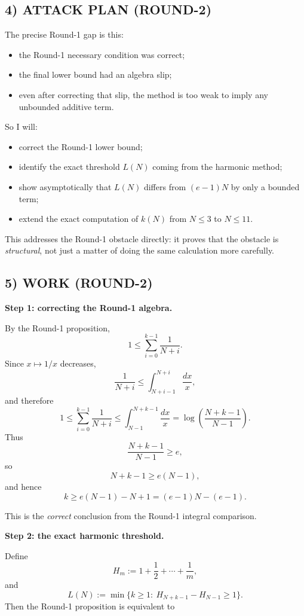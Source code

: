 \subsection*{4) ATTACK PLAN (ROUND-2)}

The precise Round-1 gap is this:

\begin{itemize}
\item the Round-1 necessary condition was correct;
\item the final lower bound had an algebra slip;
\item even after correcting that slip, the method is too weak to imply any unbounded additive term.
\end{itemize}

So I will:
\begin{itemize}
\item correct the Round-1 lower bound;
\item identify the exact threshold $L(N)$ coming from the harmonic method;
\item show asymptotically that $L(N)$ differs from $(e-1)N$ by only a bounded term;
\item extend the exact computation of $k(N)$ from $N\le 3$ to $N\le 11$.
\end{itemize}

This addresses the Round-1 obstacle directly: it proves that the obstacle is \emph{structural}, not just a matter of doing the same calculation more carefully.

\subsection*{5) WORK (ROUND-2)}

\medskip
\noindent\textbf{Step 1: correcting the Round-1 algebra.}

By the Round-1 proposition,
\[
1\le \sum_{i=0}^{k-1}\frac1{N+i}.
\]
Since $x\mapsto 1/x$ decreases,
\[
\frac1{N+i}\le \int_{N+i-1}^{N+i}\frac{dx}{x},
\]
and therefore
\[
1\le \sum_{i=0}^{k-1}\frac1{N+i}
\le \int_{N-1}^{N+k-1}\frac{dx}{x}
= \log\!\left(\frac{N+k-1}{N-1}\right).
\]
Thus
\[
\frac{N+k-1}{N-1}\ge e,
\]
so
\[
N+k-1\ge e(N-1),
\]
and hence
\[
k\ge e(N-1)-N+1=(e-1)N-(e-1).
\]

This is the \emph{correct} conclusion from the Round-1 integral comparison.

\medskip
\noindent\textbf{Step 2: the exact harmonic threshold.}

Define
\[
H_m:=1+\frac12+\cdots+\frac1m,
\]
and
\[
L(N):=\min\{k\ge 1:\ H_{N+k-1}-H_{N-1}\ge 1\}.
\]
Then the Round-1 proposition is equivalent to

